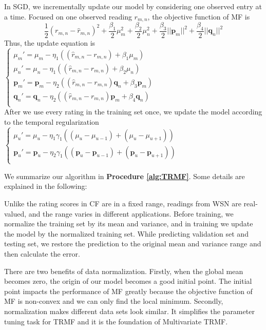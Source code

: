 In SGD, we incrementally update our model by considering one observed entry at a time. Focused on one observed reading $r_{m,n}$, the objective function of MF is
\begin{equation*} \frac{1}{2}(r_{m,n} - \hat{r}_{m,n})^2 + \frac{\beta_1}{2}\mu_m^2 + \frac{\beta_2}{2}\mu_n^2 + \frac{\beta_3}{2}||\mathbf{p}_m||^2 + \frac{\beta_4}{2}||\mathbf{q}_n||^2\end{equation*}
Thus, the update equation is\\
$\begin{cases}
	\mu_m' = \mu_m - \eta_1 ((\hat{r}_{m,n}-r_{m,n}) + \beta_1 \mu_m) \\
	\mu_n' = \mu_n - \eta_1 ((\hat{r}_{m,n}-r_{m,n}) + \beta_2 \mu_n) \\
	\mathbf{p}_{m}' = \mathbf{p}_{m} - \eta_2 ((\hat{r}_{m,n}-r_{m,n})\mathbf{q}_{n} + \beta_3 \mathbf{p}_{m})\\
	\mathbf{q}_{n}' = \mathbf{q}_{n} - \eta_2 ((\hat{r}_{m,n}-r_{m,n})\mathbf{p}_{m} + \beta_4 \mathbf{q}_{n})\\
\end{cases}$\\
After we use every rating in the training set once, we update the model according to the temporal regularization
$\begin{cases}
	\mu_u' = \mu_u - \eta_1 \gamma_1((\mu_u-\mu_{u-1})+(\mu_u-\mu_{u+1}))\\
	\mathbf{p}_{u}' = \mathbf{p}_{u} - \eta_2 \gamma_1((\mathbf{p}_{u}-\mathbf{p}_{u-1})+(\mathbf{p}_{u}-\mathbf{p}_{u+1}))\\
\end{cases}$

We summarize our algorithm in \textbf{Procedure \ref{alg:TRMF}}. Some details are explained in the following:


Unlike the rating scores in CF are in a fixed range, readings from WSN are real-valued, and the range varies in different applications. Before training, we normalize the training set by its mean and variance, and in training we update the model by the normalized training set. While predicting validation set and testing set, we restore the prediction to the original mean and variance range and then calculate the error.

There are two benefits of data normalization. Firstly, when the global mean becomes zero, the origin of our model becomes a good initial point. The initial point impacts the performance of MF greatly because the objective function of MF is non-convex and we can only find the local minimum. Secondly, normalization makes different data sets look similar. It simplifies the parameter tuning task for TRMF and it is the foundation of Multivariate TRMF. 


